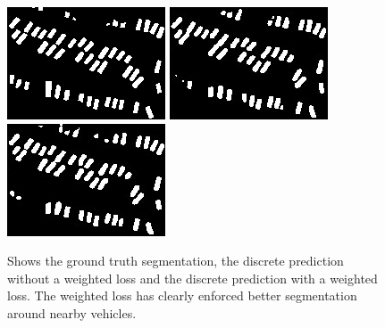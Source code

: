 \documentclass{kththesis}
\begin{document}
\begin{figure}[H]
\centering
{}
  \includegraphics[width=\linewidth]{class_vs_w/label_2}
\endminipage\hfill
{}
  \includegraphics[width=\linewidth]{class_vs_w/un_weight_2}
\endminipage\hfill
{}%
  \includegraphics[width=\linewidth]{class_vs_w/weight_2}
\endminipage
\caption{Shows the ground truth segmentation, the discrete prediction without a weighted loss and the discrete prediction with a weighted loss. The weighted loss has clearly enforced better segmentation around nearby vehicles.}
\end{figure}
\end{document}
